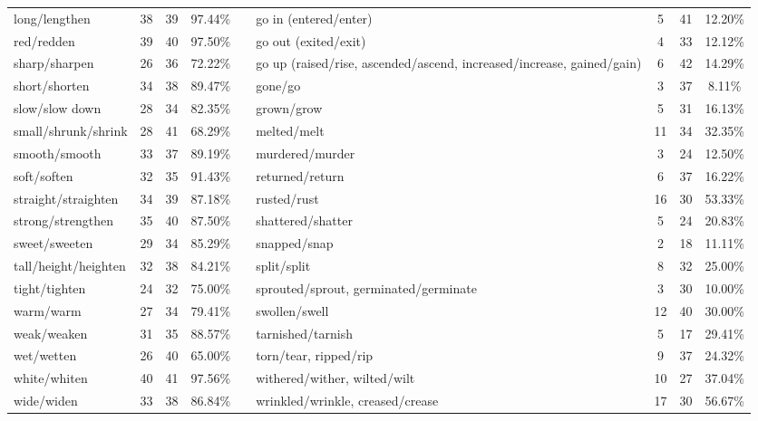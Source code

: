 \begin{tabular}{p{3cm}ccccp{3cm}ccc}
long/lengthen & 38 & 39 & 97.44\% & & go in (entered/enter) & 5 & 41 & 12.20\% \\
red/redden & 39 & 40 & 97.50\% & & go out (exited/exit) & 4 & 33 & 12.12\% \\
sharp/sharpen & 26 & 36 & 72.22\% & & go up (raised/rise, ascended/ascend, increased/increase, gained/gain) & 6 & 42 & 14.29\% \\
short/shorten & 34 & 38 & 89.47\% & & gone/go & 3 & 37 & 8.11\% \\
slow/slow down & 28 & 34 & 82.35\% & & grown/grow & 5 & 31 & 16.13\% \\
small/shrunk/shrink & 28 & 41 & 68.29\% & & melted/melt & 11 & 34 & 32.35\% \\
smooth/smooth & 33 & 37 & 89.19\% & & murdered/murder & 3 & 24 & 12.50\% \\
soft/soften & 32 & 35 & 91.43\% & & returned/return & 6 & 37 & 16.22\% \\
straight/straighten & 34 & 39 & 87.18\% & & rusted/rust & 16 & 30 & 53.33\% \\
strong/strengthen & 35 & 40 & 87.50\% & & shattered/shatter & 5 & 24 & 20.83\% \\
sweet/sweeten & 29 & 34 & 85.29\% & & snapped/snap & 2 & 18 & 11.11\% \\
tall/height/heighten & 32 & 38 & 84.21\% & & split/split & 8 & 32 & 25.00\% \\
tight/tighten & 24 & 32 & 75.00\% & & sprouted/sprout, germinated/germinate & 3 & 30 & 10.00\% \\
warm/warm & 27 & 34 & 79.41\% & & swollen/swell & 12 & 40 & 30.00\% \\
weak/weaken & 31 & 35 & 88.57\% & & tarnished/tarnish & 5 & 17 & 29.41\% \\
wet/wetten & 26 & 40 & 65.00\% & & torn/tear, ripped/rip & 9 & 37 & 24.32\% \\
white/whiten & 40 & 41 & 97.56\% & & withered/wither, wilted/wilt & 10 & 27 & 37.04\% \\
wide/widen & 33 & 38 & 86.84\% & & wrinkled/wrinkle, creased/crease & 17 & 30 & 56.67\%
\end{tabular}
